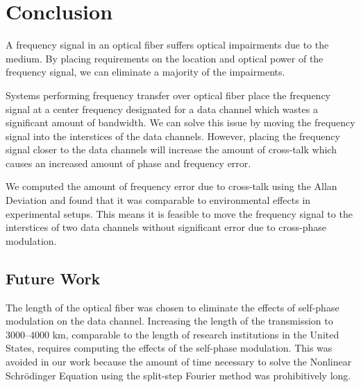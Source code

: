 \chapter{Conclusion}

A frequency signal in an optical fiber suffers optical impairments due to the medium. By placing requirements on the location and optical power of the frequency signal, we can eliminate a majority of the impairments.

Systems performing frequency transfer over optical fiber place the frequency signal at a center frequency designated for a data channel which wastes a significant amount of bandwidth. We can solve this issue by moving the frequency signal into the interstices of the data channels. However, placing the frequency signal closer to the data channels will increase the amount of cross-talk which causes an increased amount of phase and frequency error.

We computed the amount of frequency error due to cross-talk using the Allan Deviation and found that it was comparable to environmental effects in experimental setups. This means it is feasible to move the frequency signal to the interstices of two data channels without significant error due to cross-phase modulation.

\section{Future Work}

The length of the optical fiber was chosen to eliminate the effects of self-phase modulation on the data channel. Increasing the length of the transmission to $3000$--$4000$ km, comparable to the length of research institutions in the United States, requires computing the effects of the self-phase modulation. This was avoided in our work because the amount of time necessary to solve the Nonlinear Schr{\"o}dinger Equation using the split-step Fourier method was prohibitively long.